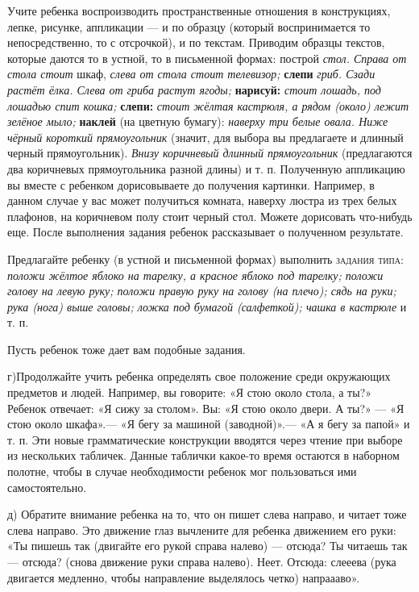\documentclass[a5paper]{book}
\renewcommand{\emph}[1]{\textit{#1}}
\begin{document}
Учите ребенка воспроизводить пространственные отношения в конструкциях,
лепке, рисунке, аппликации --- и по образцу (который воспринимается то
непосредственно, то с отсрочкой), и по текстам. Приводим образцы
текстов, которые даются то в устной, то в письменной формах: построй
\emph{стол. Справа от стола стоит} шкаф, \emph{слева от стола стоит
телевизор;} \textbf{слепи} \emph{гриб. Сзади растёт ёлка. Слева от гриба
растут ягоды;} \textbf{нарисуй:} \emph{стоит лошадь, под лошадью спит
кошка;} \textbf{слепи:} \emph{стоит жёлтая кастрюля, а рядом (около)
лежит зелёное мыло;} \textbf{наклей} (на цветную бумагу): \emph{наверху
три белые овала. Ниже чёрный короткий прямоугольник} (значит, для выбора
вы предлагаете и длинный черный прямоугольник). \emph{Внизу коричневый
длинный прямоугольник} (предлагаются два коричневых прямоугольника
разной длины) и т. п. Полученную аппликацию вы вместе с ребенком
дорисовываете до получения картинки. Например, в данном случае у вас
может получиться комната, наверху люстра из трех белых плафонов, на
коричневом полу стоит черный стол. Можете дорисовать что-нибудь еще.
После выполнения задания ребенок рассказывает о полученном результате.

Предлагайте ребенку (в устной и письменной формах) выполнить
\textsc{задания типа:} \emph{положи жёлтое яблоко на тарелку, а красное
яблоко под тарелку; положи голову на левую руку; положи правую руку на
голову (на плечо); сядь на руки; рука (нога) выше головы; ложка под
бумагой (салфеткой); чашка в кастрюле} и т. п.

Пусть ребенок тоже дает вам подобные задания.

г)Продолжайте учить ребенка определять свое положение среди окружающих
предметов и людей. Например, вы говорите: «Я стою около стола, а ты?»
Ребенок отвечает: «Я сижу за столом». Вы: «Я стою около двери. А ты?»
--- «Я стою около шкафа».--- «Я бегу за машиной (заводной)».--- «А я
бегу за папой» и т. п. Эти новые грамматические конструкции вводятся
через чтение при выборе из нескольких табличек. Данные таблички какое-то
время остаются в наборном полотне, чтобы в случае необходимости ребенок
мог пользоваться ими самостоятельно.

д) Обратите внимание ребенка на то, что он пишет слева направо, и читает
тоже слева направо. Это движение глаз вычлените для ребенка движением
его руки: «Ты пишешь так (двигайте его рукой справа налево) --- отсюда?
Ты читаешь так --- отсюда? (снова движение руки справа налево). Неет.
Отсюда: слееева (рука двигается медленно, чтобы направление выделялось
четко) напраааво».
\end{document}
